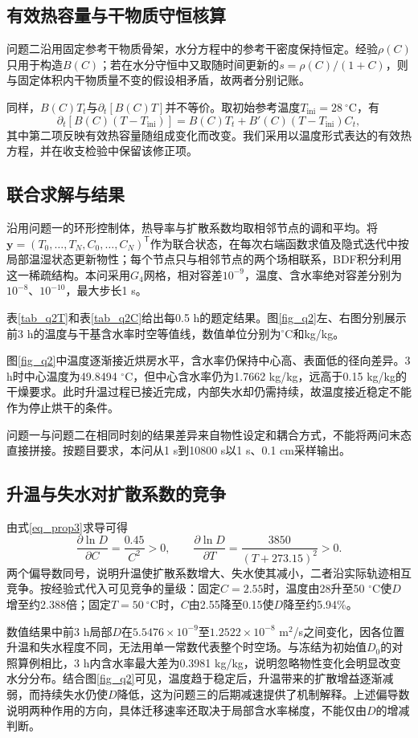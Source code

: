 \subsection{有效热容量与干物质守恒核算}
问题二沿用固定参考干物质骨架，水分方程中的参考干密度保持恒定。经验$\rho(C)$只用于构造$B(C)$；若在水分守恒中又取随时间更新的$s=\rho(C)/(1+C)$，则与固定体积内干物质量不变的假设相矛盾，故两者分别记账。

同样，$B(C)T_t$与$\partial_t[B(C)T]$并不等价。取初始参考温度$T_{\mathrm{ini}}=28\ ^\circ$C，有
\begin{equation}\label{eq_B_identity}
\partial_t[B(C)(T-T_{\mathrm{ini}})]=B(C)T_t+B'(C)(T-T_{\mathrm{ini}})C_t,
\end{equation}
其中第二项反映有效热容量随组成变化而改变。我们采用以温度形式表达的有效热方程，并在收支检验中保留该修正项。

\subsection{联合求解与结果}
沿用问题一的环形控制体，热导率与扩散系数均取相邻节点的调和平均。将$\boldsymbol y=(T_0,\ldots,T_N,C_0,\ldots,C_N)^{\mathsf T}$作为联合状态，在每次右端函数求值及隐式迭代中按局部温湿状态更新物性；每个节点只与相邻节点的两个场相联系，BDF积分利用这一稀疏结构。本问采用$G_4$网格，相对容差$10^{-9}$，温度、含水率绝对容差分别为$10^{-8}$、$10^{-10}$，最大步长1 s。

表\ref{tab_q2T}和表\ref{tab_q2C}给出每0.5 h的题定结果。图\ref{fig_q2}左、右图分别展示前3 h的温度与干基含水率时空等值线，数值单位分别为$^\circ$C和kg/kg。



图\ref{fig_q2}中温度逐渐接近烘房水平，含水率仍保持中心高、表面低的径向差异。3 h时中心温度为49.8494 $^\circ$C，但中心含水率仍为1.7662 kg/kg，远高于0.15 kg/kg的干燥要求。此时升温过程已接近完成，内部失水却仍需持续，故温度接近稳定不能作为停止烘干的条件。

问题一与问题二在相同时刻的结果差异来自物性设定和耦合方式，不能将两问末态直接拼接。按题目要求，本问从1 s到10800 s以1 s、0.1 cm采样输出。

\subsection{升温与失水对扩散系数的竞争}
由式\eqref{eq_prop3}求导可得
\begin{equation}\label{eq_logD}
\frac{\partial\ln D}{\partial C}=\frac{0.45}{C^2}>0,\qquad
\frac{\partial\ln D}{\partial T}=\frac{3850}{(T+273.15)^2}>0.
\end{equation}
两个偏导数同号，说明升温使扩散系数增大、失水使其减小，二者沿实际轨迹相互竞争。按经验式代入可见竞争的量级：固定$C=2.55$时，温度由28升至50 $^\circ$C使$D$增至约2.388倍；固定$T=50\ ^\circ$C时，$C$由2.55降至0.15使$D$降至约5.94\%。

数值结果中前3 h局部$D$在$5.5476\times10^{-9}$至$1.2522\times10^{-8}$ m$^2$/s之间变化，因各位置升温和失水程度不同，无法用单一常数代表整个时空场。与冻结为初始值$D_0$的对照算例相比，3 h内含水率最大差为0.3981 kg/kg，说明忽略物性变化会明显改变水分分布。结合图\ref{fig_q2}可见，温度趋于稳定后，升温带来的扩散增益逐渐减弱，而持续失水仍使$D$降低，这为问题三的后期减速提供了机制解释。上述偏导数说明两种作用的方向，具体迁移速率还取决于局部含水率梯度，不能仅由$D$的增减判断。
\FloatBarrier
